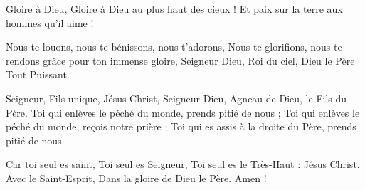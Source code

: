 Gloire à Dieu, Gloire à Dieu au plus haut des cieux !
Et paix sur la terre aux hommes qu'il aime !

Nous te louons, nous te bénissons, nous t'adorons,
Nous te glorifions, nous te rendons grâce pour ton immense gloire,
Seigneur Dieu, Roi du ciel, Dieu le Père Tout Puissant.

Seigneur, Fils unique, Jésus Christ,
Seigneur Dieu, Agneau de Dieu, le Fils du Père.
Toi qui enlèves le péché du monde, prends pitié de nous ;
Toi qui enlèves le péché du monde, reçois notre prière ;
Toi qui es assis à la droite du Père, prends pitié de nous.

Car toi seul es saint, Toi seul es Seigneur,
Toi seul es le Très-Haut : Jésus Christ.
Avec le Saint-Esprit, Dans la gloire de Dieu le Père.
Amen !
